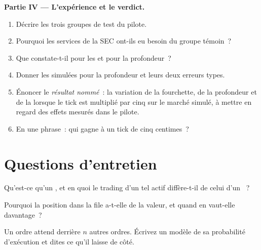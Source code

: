 \begin{problem}
\medskip\noindent\textbf{Partie IV --- L'expérience et le verdict.}
\begin{enumerate}[resume]
\item Décrire les trois groupes de test du pilote.
\item Pourquoi les services de la SEC ont-ils eu besoin du groupe témoin~?
\item Que constate-t-il pour les  et pour la profondeur~?
\item Donner les  simulées pour la profondeur et leurs deux erreurs types.
\item Énoncer le \emph{résultat nommé}~: la variation de la fourchette, de la profondeur et de la  lorsque le tick est multiplié par cinq sur le marché simulé, à mettre en regard des
effets mesurés dans le pilote.
\item En une phrase~: qui gagne à un tick de cinq centimes~?
\end{enumerate}
\end{problem}

\section{Questions d'entretien}

\begin{interviewq}\label{iq:mx:tick-size-queues-and-priority:1}
Qu'est-ce qu'un , et en quoi le trading d'un tel actif diffère-t-il de celui d'un ~?
\end{interviewq}

\begin{interviewq}\label{iq:mx:tick-size-queues-and-priority:2}
Pourquoi la position dans la file a-t-elle de la valeur, et quand en vaut-elle davantage~?
\end{interviewq}

\begin{interviewq}\label{iq:mx:tick-size-queues-and-priority:3}
Un ordre attend derrière $n$ autres ordres. Écrivez un modèle de sa probabilité d'exécution et dites ce qu'il laisse de côté.
\end{interviewq}

